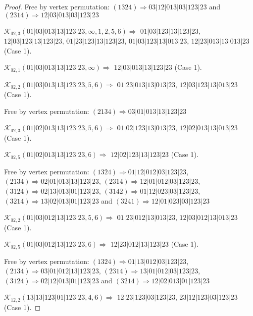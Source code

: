 \documentclass[12pt]{article}
\theoremstyle{plain}
\theoremstyle{definition}
\theoremstyle{remark}
\newcommand{\fancy}[1]{\mathcal{#1}}
\def\K{\fancy{K}}
\begin{document}
\begin{proof}
	Free by vertex permutation: $(1 3 2 4)\Rightarrow 03|12|013|03|123|23$ and $(2 3 1 4)\Rightarrow 12|03|013|03|123|23$
	
	
	
	\bigskip
	
	$\K_{02,3}(01|03|013|13|123|23,\infty,1, 2, 5, 6)\Rightarrow $ $01|03|123|13|123|23$, $12|03|123|13|123|23$, $01|23|123|13|123|23$, $01|03|123|13|013|23$, $12|23|013|13|013|23$ (Case 1).
	
	$\K_{02,1}(01|03|013|13|123|23,\infty)\Rightarrow $ $12|03|013|13|123|23$ (Case 1).
	
	$\K_{02,2}(01|03|013|13|123|23,5, 6)\Rightarrow $ $01|23|013|13|013|23$, $12|03|123|13|013|23$ (Case 1).
	
	
	
	Free by vertex permutation: $(2 1 3 4)\Rightarrow 03|01|013|13|123|23$
	
	
	
	\bigskip
	
	$\K_{02,3}(01|02|013|13|123|23,5, 6)\Rightarrow $ $01|02|123|13|013|23$, $12|02|013|13|013|23$ (Case 1).
	
	$\K_{02,5}(01|02|013|13|123|23,6)\Rightarrow $ $12|02|123|13|123|23$ (Case 1).
	
	
	
	Free by vertex permutation: $(1 3 2 4)\Rightarrow 01|12|012|03|123|23$, $(2 1 3 4)\Rightarrow 02|01|013|13|123|23$, $(2 3 1 4)\Rightarrow 12|01|012|03|123|23$, $(3 1 2 4)\Rightarrow 02|13|013|01|123|23$, $(3 1 4 2)\Rightarrow 01|12|023|03|123|23$, $(3 2 1 4)\Rightarrow 13|02|013|01|123|23$ and $(3 2 4 1)\Rightarrow 12|01|023|03|123|23$
	
	
	
	\bigskip
	
	$\K_{02,2}(01|03|012|13|123|23,5, 6)\Rightarrow $ $01|23|012|13|013|23$, $12|03|012|13|013|23$ (Case 1).
	
	$\K_{02,5}(01|03|012|13|123|23,6)\Rightarrow $ $12|23|012|13|123|23$ (Case 1).
	
	
	
	Free by vertex permutation: $(1 3 2 4)\Rightarrow 01|13|012|03|123|23$, $(2 1 3 4)\Rightarrow 03|01|012|13|123|23$, $(2 3 1 4)\Rightarrow 13|01|012|03|123|23$, $(3 1 2 4)\Rightarrow 02|12|013|01|123|23$ and $(3 2 1 4)\Rightarrow 12|02|013|01|123|23$
	
	
	
	\bigskip
	
	$\K_{12,2}(13|13|123|01|123|23,4, 6)\Rightarrow $ $12|23|123|03|123|23$, $23|12|123|03|123|23$ (Case 1).
	

\end{proof}
\end{document}
